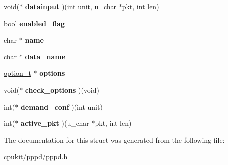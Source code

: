 \begin{DoxyCompactItemize}
\mbox{\label{structprotent_aa7421e646f384fd17c0492c1dd947015}} 
void($\ast$ {\bfseries datainput} )(int unit, u\+\_\+char $\ast$pkt, int len)
\item 
\mbox{\label{structprotent_ae7f15f6da0462f5c29798b180088a3b8}} 
bool {\bfseries enabled\+\_\+flag}
\item 
\mbox{\label{structprotent_a0eee94de05a84e5f0c2088dae92231ac}} 
char $\ast$ {\bfseries name}
\item 
\mbox{\label{structprotent_adebb44012e24e4b1c6493b3cf8c48334}} 
char $\ast$ {\bfseries data\+\_\+name}
\item 
\mbox{\label{structprotent_a556b25179f607a997bf297c0078a8747}} 
\mbox{\hyperlink{structoption__t}{option\+\_\+t}} $\ast$ {\bfseries options}
\item 
\mbox{\label{structprotent_a17678c501a1cefcb3687f5e9b71b9ec1}} 
void($\ast$ {\bfseries check\+\_\+options} )(void)
\item 
\mbox{\label{structprotent_a72d12019141fe987a1bf424bc5fce1c2}} 
int($\ast$ {\bfseries demand\+\_\+conf} )(int unit)
\item 
\mbox{\label{structprotent_ae0ea12986b83fe5abd2d8c3bf7810e1f}} 
int($\ast$ {\bfseries active\+\_\+pkt} )(u\+\_\+char $\ast$pkt, int len)
\end{DoxyCompactItemize}


The documentation for this struct was generated from the following file\+:\begin{DoxyCompactItemize}
\item 
cpukit/pppd/pppd.\+h\end{DoxyCompactItemize}
